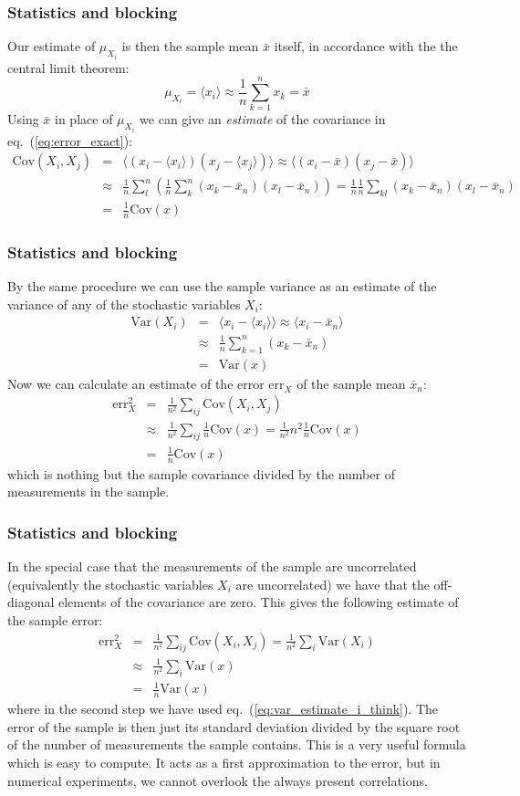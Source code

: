 \documentclass[compress]{beamer}
\newcommand{\bea}{\begin{eqnarray}}
\newcommand{\beaN}{\begin{eqnarray*}}
\newcommand{\eea}{\end{eqnarray}}
\newcommand{\eeaN}{\end{eqnarray*}}
\newcommand{\bdm}{\begin{displaymath}}
\newcommand{\edm}{\end{displaymath}}
\newcommand{\mean}[1]{\langle #1 \rangle}
\newcommand{\cov}[0]{\mathrm{Cov}}   %
\newcommand{\var}[0]{\mathrm{Var}}   %
\begin{document}
\frame
{
  \frametitle{Statistics and blocking}
\begin{small}
{\scriptsize
Our estimate of $\mu_{X_i}^{\phantom X}$ is then the sample mean $\bar x$
itself, in accordance with the the central limit theorem:
\bdm
\mu_{X_i}^{\phantom X} = \mean{x_i} \approx \frac{1}{n}\sum_{k=1}^n
x_k = \bar x
\edm
Using $\bar x$ in place of $\mu_{X_i}^{\phantom X}$ we can give an
\emph{estimate} of the covariance in eq.~(\ref{eq:error_exact}):
\beaN
\cov(X_i, X_j) &=& \mean{(x_i-\mean{x_i})(x_j-\mean{x_j})}
\approx\mean{(x_i - \bar x)(x_j - \bar{x})}\\
&\approx&\frac{1}{n} \sum_{l}^n \left(\frac{1}{n}\sum_{k}^n (x_k -
\bar x_n)(x_l - \bar x_n)\right)
=\frac{1}{n}\frac{1}{n} \sum_{kl} (x_k -
\bar x_n)(x_l - \bar x_n)\\
&=&\frac{1}{n}\cov(x)
\eeaN
}
\end{small}
}



\frame
{
  \frametitle{Statistics and blocking}
\begin{small}
{\scriptsize
By the same procedure we can use the sample variance as an
estimate of the variance of any of the stochastic variables $X_i$:
\bea
\var(X_i)
&=&\mean{x_i - \mean{x_i}} \approx \mean{x_i - \bar x_n}\nonumber\\
&\approx&\frac{1}{n}\sum_{k=1}^n (x_k - \bar x_n)\nonumber\\
&=&\var(x)
\label{eq:var_estimate_i_think}
\eea
Now we can calculate an estimate of the error
$\mathrm{err}_X^{\phantom X}$ of the sample mean $\bar x_n$:
\bea
\mathrm{err}_X^2
&=&\frac{1}{n^2}\sum_{ij} \cov(X_i, X_j) \nonumber \\
&\approx&\frac{1}{n^2}\sum_{ij}\frac{1}{n}\cov(x) =
\frac{1}{n^2}n^2\frac{1}{n}\cov(x)\nonumber\\
&=&\frac{1}{n}\cov(x)
\label{eq:error_estimate}
\eea
which is nothing but the sample covariance divided by the number of
measurements in the sample.
}
\end{small}
}

\frame
{
  \frametitle{Statistics and blocking}
\begin{small}
{\scriptsize
In the special case that the measurements of the sample are
uncorrelated (equivalently the stochastic variables $X_i$ are
uncorrelated) we have that the off-diagonal elements of the covariance
are zero. This gives the following estimate of the sample error:
\bea
\mathrm{err}_X^2 &=& \frac{1}{n^2}\sum_{ij} \cov(X_i, X_j) =
\frac{1}{n^2} \sum_i \var(X_i)\nonumber\\
&\approx&
\frac{1}{n^2} \sum_i \var(x)\nonumber\\ &=& \frac{1}{n}\var(x)
\label{eq:error_estimate_uncorrel}
\eea
where in the second step we have used eq.~(\ref{eq:var_estimate_i_think}).
The error of the sample is then just its standard deviation divided by
the square root of the number of measurements the sample contains.
This is a very useful formula which is easy to compute. It acts as a
first approximation to the error, but in numerical experiments, we
cannot overlook the always present correlations.
}
\end{small}
}
\end{document}
